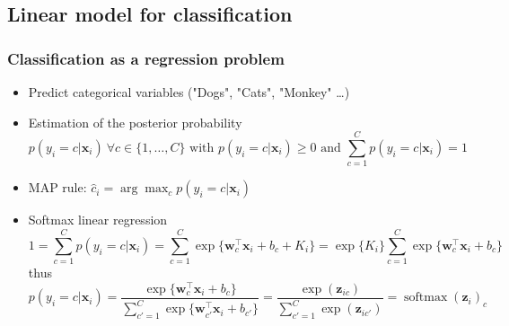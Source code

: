 \documentclass[pressentation,10pt,aspectratio=169,xcolor=table, colorlinks=true]{beamer}
\DeclareMathOperator{\softmax}{softmax}
\begin{document}
\subsection{Linear model for classification}

\begin{frame}
  \frametitle{Classification as a regression problem}
  \begin{itemize}
  \item Predict categorical variables ("Dogs", "Cats", "Monkey" \ldots)
  \item Estimation of the posterior probability \[p(y_i=c | \mathbf{x}_i)\ \forall c\in\big\{1, \ldots, C\big\} \text{ with } p(y_i=c | \mathbf{x}_i)\geq 0 \text{ and }\sum_{c=1}^Cp(y_i=c | \mathbf{x}_i)=1\]
  \item MAP rule: \(\hat{c}_i = \arg\max_{c} p(y_i=c | \mathbf{x}_i)\)
  \item <2-> Softmax linear regression
    \[1 = \sum_{c=1}^Cp(y_i=c | \mathbf{x}_i) = \sum_{c=1}^C \exp\Big\{\mathbf{w}_c^\top\mathbf{x}_i + b_c + K_i\Big\} = \exp\{K_i\}\sum_{c=1}^C \exp\Big\{\mathbf{w}_c^\top\mathbf{x}_i + b_c\Big\}\]
    thus
    \[p(y_i=c | \mathbf{x}_i) = \frac{\exp\Big\{\mathbf{w}_{c}^\top\mathbf{x}_i + b_{c}\Big\}}{\sum_{c'=1}^C \exp\Big\{\mathbf{w}_{c'}^\top\mathbf{x}_i + b_{c'}\Big\}}= \frac{\exp(\mathbf{z}_{ic})}{\sum_{c'=1}^C\exp(\mathbf{z}_{ic'})}=\softmax(\mathbf{z}_i)_c\] 
  \end{itemize}
\end{frame}
\end{document}
